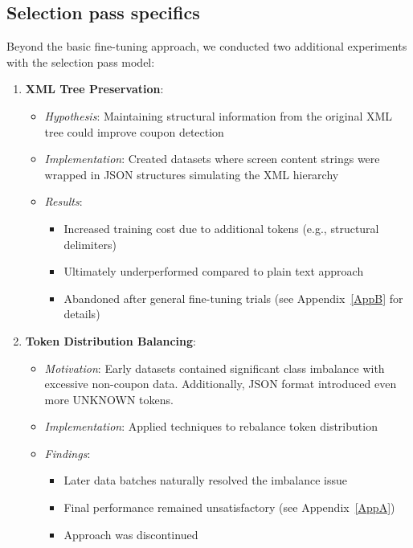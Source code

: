 \documentclass[licencjacka,en]{pracamgr}
\begin{document}
\subsection{Selection pass specifics}
Beyond the basic fine-tuning approach, we conducted two additional experiments with the selection pass model:

\begin{enumerate}
    \item \textbf{XML Tree Preservation}:
    \begin{itemize}
        \item \textit{Hypothesis}: Maintaining structural information from the original XML tree could improve coupon detection
        \item \textit{Implementation}: Created datasets where screen content strings were wrapped in JSON structures simulating the XML hierarchy
        \item \textit{Results}:
        \begin{itemize}
            \item Increased training cost due to additional tokens (e.g., structural delimiters)
            \item Ultimately underperformed compared to plain text approach
            \item Abandoned after general fine-tuning trials (see Appendix~\ref{AppB} for details)
        \end{itemize}
    \end{itemize}
    
    \item \textbf{Token Distribution Balancing}:
    \begin{itemize}
        \item \textit{Motivation}: Early datasets contained significant class imbalance with excessive non-coupon data. Additionally, JSON format introduced even more UNKNOWN tokens.
        \item \textit{Implementation}: Applied techniques to rebalance token distribution
        \item \textit{Findings}:
        \begin{itemize}
            \item Later data batches naturally resolved the imbalance issue
            \item Final performance remained unsatisfactory (see Appendix~\ref{AppA})
            \item Approach was discontinued
        \end{itemize}
    \end{itemize}
\end{enumerate}
\end{document}
